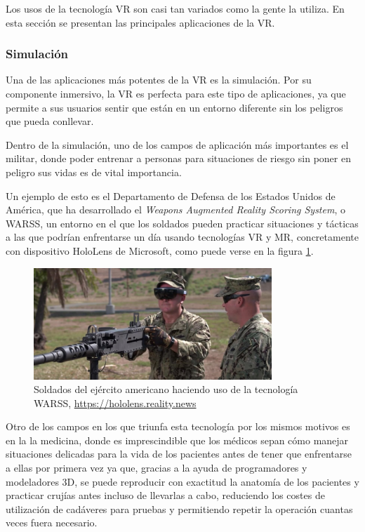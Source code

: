 Los usos de la tecnología \acs{VR} son casi tan variados como la gente la utiliza. En esta sección se presentan las principales aplicaciones de la \acs{VR}.

\subsubsection{Simulación}

Una de las aplicaciones más potentes de la \acs{VR} es la simulación. Por su componente inmersivo, la \acs{VR} es perfecta para este tipo de aplicaciones, ya que permite a sus usuarios sentir que están en un entorno diferente sin los peligros que pueda conllevar.

Dentro de la simulación, uno de los campos de aplicación más importantes es el militar, donde poder entrenar a personas para situaciones de riesgo sin poner en peligro sus vidas es de vital importancia.

Un ejemplo de esto es el Departamento de Defensa de los Estados Unidos de América, que ha desarrollado el \textit{Weapons Augmented Reality Scoring System}, o WARSS, un entorno en el que los soldados pueden practicar situaciones y tácticas a las que podrían enfrentarse un día usando tecnologías \acs{VR} y \acs{MR}, concretamente con dispositivo HoloLens de Microsoft, como puede verse en la figura \ref{fig:warss}.

\begin{figure}[!h]
\begin{center}
\includegraphics[width=0.8\textwidth]{imagenes/2/WARSS.jpg}
\caption{Soldados del ejército americano haciendo uso de la tecnología WARSS, \url{https://hololens.reality.news}}
\label{fig:warss}
\end{center}
\end{figure}

Otro de los campos en los que triunfa esta tecnología por los mismos motivos es en la la medicina, donde es imprescindible que los médicos sepan cómo manejar situaciones delicadas para la vida de los pacientes antes de tener que enfrentarse a ellas por primera vez ya que, gracias a la ayuda de programadores y modeladores 3D, se puede reproducir con exactitud la anatomía de los pacientes y practicar crujías antes incluso de llevarlas a cabo, reduciendo los costes de utilización de cadáveres para pruebas y permitiendo repetir la operación cuantas veces fuera necesario.

